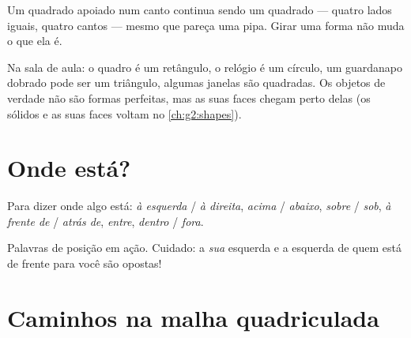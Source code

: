 \begin{example}\label{ex:g1:shapes:tilted}
Um quadrado apoiado num canto continua sendo um quadrado --- quatro
lados iguais, quatro cantos --- mesmo que pareça uma pipa. Girar uma
forma não muda o que ela é.
\end{example}

\begin{example}\label{ex:g1:shapes:hunt}
Na sala de aula: o quadro é um retângulo, o relógio é um círculo, um
guardanapo dobrado pode ser um triângulo, algumas janelas são
quadradas. Os objetos de verdade não são formas perfeitas, mas as
suas faces chegam perto delas (os sólidos e as suas faces voltam no
\cref{ch:g2:shapes}).
\end{example}

\section{Onde está?}

\begin{definition}\label{def:g1:shapes:position}
Para dizer onde algo está: \emph{à esquerda} / \emph{à direita},
\emph{acima} / \emph{abaixo}, \emph{sobre} / \emph{sob},
\emph{à frente de} / \emph{atrás de}, \emph{entre},
\emph{dentro} / \emph{fora}.
\end{definition}

\begin{omfigure}

{\small Palavras de posição em ação. Cuidado: a \emph{sua} esquerda e
a esquerda de quem está de frente para você são opostas!}
\end{omfigure}

\section{Caminhos na malha quadriculada}

